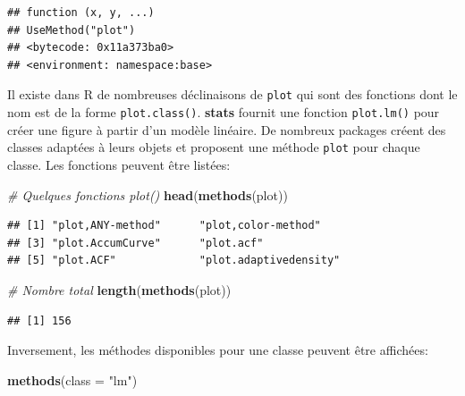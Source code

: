 \documentclass[
  12pt,
  french,
  a4paper,
  extrafontsizes,onecolumn,openright
  ]{memoir}
\newenvironment{Shaded}{\begin{snugshade}}{\end{snugshade}}
\newcommand{\AttributeTok}[1]{\textcolor[rgb]{0.13,0.29,0.53}{#1}}
\newcommand{\CommentTok}[1]{\textcolor[rgb]{0.56,0.35,0.01}{\textit{#1}}}
\newcommand{\FunctionTok}[1]{\textcolor[rgb]{0.13,0.29,0.53}{\textbf{#1}}}
\newcommand{\NormalTok}[1]{#1}
\newcommand{\StringTok}[1]{\textcolor[rgb]{0.31,0.60,0.02}{#1}}
\begin{document}
\begin{verbatim}
## function (x, y, ...) 
## UseMethod("plot")
## <bytecode: 0x11a373ba0>
## <environment: namespace:base>
\end{verbatim}

\normalsize

Il existe dans R de nombreuses déclinaisons de \texttt{plot} qui sont des fonctions dont le nom est de la forme \texttt{plot.class()}.
\textbf{stats} fournit une fonction \texttt{plot.lm()} pour créer une figure à partir d'un modèle linéaire.
De nombreux packages créent des classes adaptées à leurs objets et proposent une méthode \texttt{plot} pour chaque classe.
Les fonctions peuvent être listées:

\scriptsize

\begin{Shaded}
\begin{Highlighting}[]
\CommentTok{\# Quelques fonctions plot()}
\FunctionTok{head}\NormalTok{(}\FunctionTok{methods}\NormalTok{(plot))}
\end{Highlighting}
\end{Shaded}

\begin{verbatim}
## [1] "plot,ANY-method"      "plot,color-method"   
## [3] "plot.AccumCurve"      "plot.acf"            
## [5] "plot.ACF"             "plot.adaptivedensity"
\end{verbatim}

\begin{Shaded}
\begin{Highlighting}[]
\CommentTok{\# Nombre total}
\FunctionTok{length}\NormalTok{(}\FunctionTok{methods}\NormalTok{(plot))}
\end{Highlighting}
\end{Shaded}

\begin{verbatim}
## [1] 156
\end{verbatim}

\normalsize

Inversement, les méthodes disponibles pour une classe peuvent être affichées:

\scriptsize

\begin{Shaded}
\begin{Highlighting}[]
\FunctionTok{methods}\NormalTok{(}\AttributeTok{class =} \StringTok{"lm"}\NormalTok{)}
\end{Highlighting}
\end{Shaded}
\end{document}
